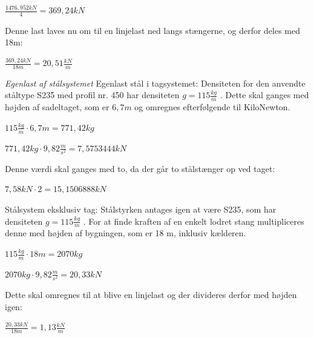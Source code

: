 \begin{center}
	$\frac{1476,952 kN}{4} =  369,\!24 kN$
\end{center}

Denne last laves nu om til en linjelast ned langs stængerne, og derfor deles med 18m:
 
\begin{center}
	$\frac{369,24 kN}{18m} =  20,\!51 \frac{kN}{m}$
\end{center} 

\textit{Egenlast af stålsystemet}
\newline
Egenlast stål i tagsystemet:
\newline
Densiteten for den anvendte ståltype S235 med profil nr. 450 har densiteten $g=115\frac{kg}{m}$ \citep{Stabi}. Dette skal ganges med højden af sadeltaget, som er $6,\!7m$ og omregnes efterfølgende til KiloNewton.  
\begin{center}
	$115\frac{kg}{m}\cdot 6,\!7m = 771,\! 42 kg$
\end{center}

\begin{center}
	$771,\! 42kg\cdot 9,\! 82\frac{m}{s^2} = 7,\! 5753444 kN$
\end{center}

Denne værdi skal ganges med to, da der går to stålstænger op ved taget:

\begin{center}
$7,\! 58kN \cdot 2 = 15,\! 1506888 kN$
\end{center}

Stålsystem eksklusiv tag:
\newline
Stålstyrken antages igen at være S235, som har densiteten $g=115\frac{kg}{m}$ \citep{Stabi}. For at finde kraften af en enkelt lodret stang multipliceres denne med højden af bygningen, som er 18 m, inklusiv kælderen.
\begin{center}
	$115\frac{kg}{m}\cdot 18m = 2070 kg$
\end{center}

\begin{center}
	$2070 kg \cdot 9,\!82\frac{m}{s^2} = 20,\! 33 kN$
\end{center}

Dette skal omregnes til at blive en linjelast og der divideres derfor med højden igen:

\begin{center}
$\frac{20,\! 33 kN}{18m} = 1,\! 13\frac{kN}{m}$
\end{center}

